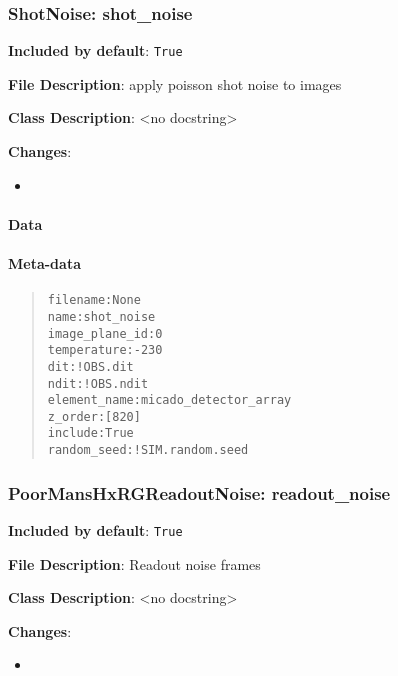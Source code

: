 \subsubsection{ShotNoise: \textquotedbl{}shot\_noise\textquotedbl{}%
  \label{shotnoise-shot-noise}%
}

\textbf{Included by default}: \texttt{True}

\textbf{File Description}: apply poisson shot noise to images

\textbf{Class Description}: <no docstring>

\textbf{Changes}:

\begin{itemize}
\item \end{itemize}


\paragraph{Data%
  \label{id11}%
}


\paragraph{Meta-data%
  \label{id12}%
}

\begin{quote}
\begin{alltt}
      filename : None
          name : shot_noise
image_plane_id : 0
   temperature : -230
           dit : !OBS.dit
          ndit : !OBS.ndit
  element_name : micado_detector_array
       z_order : [820]
       include : True
   random_seed : !SIM.random.seed
\end{alltt}
\end{quote}


\subsubsection{PoorMansHxRGReadoutNoise: \textquotedbl{}readout\_noise\textquotedbl{}%
  \label{poormanshxrgreadoutnoise-readout-noise}%
}

\textbf{Included by default}: \texttt{True}

\textbf{File Description}: Readout noise frames

\textbf{Class Description}: <no docstring>

\textbf{Changes}:

\begin{itemize}
\item \end{itemize}


